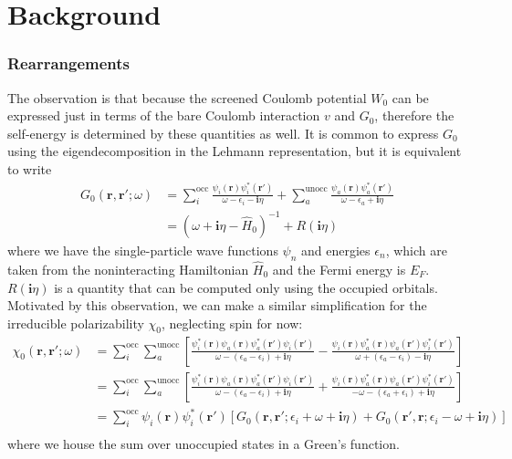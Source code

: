 \section{Background}
\subsubsection{Rearrangements}
The observation is that because the screened Coulomb potential $W_0$ can be expressed just in terms of the bare Coulomb interaction $v$ and $G_0$, therefore the self-energy is determined by these quantities as well. It is common to express $G_0$ using the eigendecomposition in the Lehmann representation, but it is equivalent to write
\begin{align}
    G_0(\mathbf{r}, \mathbf{r}'; \omega) &= \sum_i^{\text{occ}} \frac{\psi_i(\mathbf{r}) \psi_i^*(\mathbf{r'})}{\omega - \epsilon_i - \bm{i}\eta} + \sum_a^{\text{unocc}} \frac{\psi_a(\mathbf{r}) \psi_a^*(\mathbf{r'})}{\omega - \epsilon_a + \bm{i}\eta}\\
    &= \left( \omega + \bm{i}\eta - \hat{H}_0 \right)^{-1} + R(\bm{i}\eta)
\end{align}
where we have the single-particle wave functions $\psi_n$ and energies $\epsilon_n$, which are taken from the noninteracting Hamiltonian $\hat{H}_0$ and the Fermi energy is $E_F$. $R(\bm{i}\eta)$ is a quantity that can be computed only using the occupied orbitals. Motivated by this observation, we can make a similar simplification for the irreducible polarizability $\chi_0$, neglecting spin for now:
\begin{align}
    \chi_0(\mathbf{r}, \mathbf{r}'; \omega) &= \sum_i^{\text{occ}} \sum_a^{\text{unocc}} \left[\frac{\psi_i^*(\mathbf{r}) \psi_a(\mathbf{r}) \psi_a^*(\mathbf{r'}) \psi_i(\mathbf{r'})}{\omega - (\epsilon_a - \epsilon_i) + \bm{i}\eta} - \frac{\psi_i(\mathbf{r}) \psi_a^*(\mathbf{r}) \psi_a(\mathbf{r'}) \psi_i^*(\mathbf{r'})}{\omega + (\epsilon_a - \epsilon_i) - \bm{i}\eta}\right]\\
&= \sum_i^{\text{occ}} \sum_a^{\text{unocc}} \left[\frac{\psi_i^*(\mathbf{r}) \psi_a(\mathbf{r}) \psi_a^*(\mathbf{r'}) \psi_i(\mathbf{r'})}{\omega - (\epsilon_a - \epsilon_i) + \bm{i}\eta} + \frac{\psi_i(\mathbf{r}) \psi_a^*(\mathbf{r}) \psi_a(\mathbf{r'}) \psi_i^*(\mathbf{r'})}{-\omega - (\epsilon_a + \epsilon_i) + \bm{i}\eta}\right]\\
&= \sum_i^{\text{occ}} \psi_i(\mathbf{r}) \psi_i^*(\mathbf{r'}) \left[G_0(\mathbf{r}, \mathbf{r'}; \epsilon_i + \omega + \bm{i}\eta) + G_0(\mathbf{r'}, \mathbf{r}; \epsilon_i - \omega + \bm{i}\eta)\right]\\
\end{align}
where we house the sum over unoccupied states in a Green's function.
